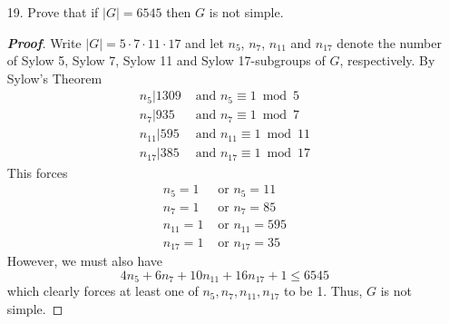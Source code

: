 \documentclass[12pt,leqno]{book}
\theoremstyle{definition}
\newenvironment{Proof}{\begin{proof}[\textnormal{\textbf{Proof}}]}{\end{proof}}
\begin{document}
\begin{enumerate}
\begin{Proof}
This forces \begin{align*}n_3=1&\text{ or }n_3=7\\n_5=1&\text{ or }n_5=21\\n_7=1&\text{ or }n_7=15\end{align*} However, we must also have \[2n_3+4n_5+6n_7+1\leq105\] Thus at least one of $n_5$ and $n_7$ to be 1. Let $P$ and $Q$ be some Sylow 5-subgroup and some Sylow 7-subgroup, respectively. Since one of $n_5$ and $n_7$ is 1, one of $P$ and $Q$ is normal, hence $PQ$ is a subgroup of $G$. Moreover, $[G:PQ]=3$, which is the smallest prime dividing $|G|$, thus $PQ$ is normal. Since $PQ$ is normal, it must contain all conjugates of $P$ and $Q$, hence it must contain all Sylow 5 and Sylow 7-subgroups. Thus, $n_5$ and $n_7$ must satisfy $n_5\equiv1\bmod{7}$ and $n_7\equiv1\bmod{5}$, which forces $n_5=n_7=1$. 
\end{Proof}

 \item [19.] Prove that if $|G|=6545$ then $G$ is not simple.
\begin{Proof}
 Write $|G|=5\cdot7\cdot11\cdot17$ and let $n_5$, $n_7$, $n_{11}$ and $n_{17}$ denote the number of Sylow 5, Sylow 7, Sylow 11 and Sylow 17-subgroups of $G$, respectively. By Sylow's Theorem \begin{align*}n_5|1309&\text{ and }n_5\equiv1\bmod{5}\\n_7|935&\text{  and  }n_7\equiv1\bmod{7}\\n_{11}|595&\text{  and  }n_{11}\equiv1\bmod{11}\\n_{17}|385&\text{  and  }n_{17}\equiv1\bmod{17}\end{align*} This forces \begin{align*}n_5=1&\text{ or }n_5=11\\n_7=1&\text{ or }n_7=85\\n_{11}=1&\text{ or }n_{11}=595\\n_{17}=1&\text{ or }n_{17}=35\end{align*} However, we must also have \[4n_5+6n_7+10n_{11}+16n_{17}+1\leq6545\] which clearly forces at least one of $n_5,n_7,n_{11},n_{17}$ to be 1. Thus, $G$ is not simple.
\end{Proof}


\end{enumerate}
\end{document}
